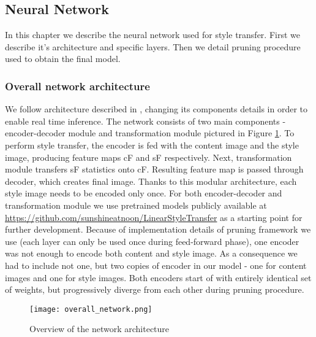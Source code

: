 \documentclass[../Main.tex]{subfiles}
\begin{document}
    

\subsection{Neural Network} \label{network}
    In this chapter we describe the neural network used for style transfer. 
    First we describe it's architecture and specific layers. Then we detail
    pruning procedure used to obtain the final model.
    \subsubsection{Overall network architecture} 
    We follow architecture described in \cite{Li2018}, changing its components details 
    in order to enable real time inference. The network consists of two 
    main components - encoder-decoder module and
    transformation module pictured in Figure \ref{fig:overall_network}.
    To perform style transfer, the encoder is fed with the content image
    and the style image, producing feature maps cF and sF respectively.
    Next, transformation module transfers sF statistics onto cF. Resulting 
    feature map is passed through decoder, which creates final image. 
    Thanks to this modular architecture, each style image needs to be encoded
    only once. For both encoder-decoder and
    transformation module we use pretrained models publicly available at 
    \url{https://github.com/sunshineatnoon/LinearStyleTransfer}
    as a starting point for further development. Because of implementation details
    of pruning framework we use (each layer can only be used once during 
    feed-forward phase), one encoder was not enough to encode both content and
    style image. As a consequence we had to include not one, but two copies of encoder
    in our model - one for content images and one for style images. Both encoders start of with entirely identical set of weights, but progressively diverge from each other during pruning procedure.
    
    \begin{figure}[h!]
        \texttt{[image: overall\_network.png]}
        \caption{Overview of the network architecture \cite{Li2018}}
        \label{fig:overall_network}
    \end{figure}
    
    
\end{document}
